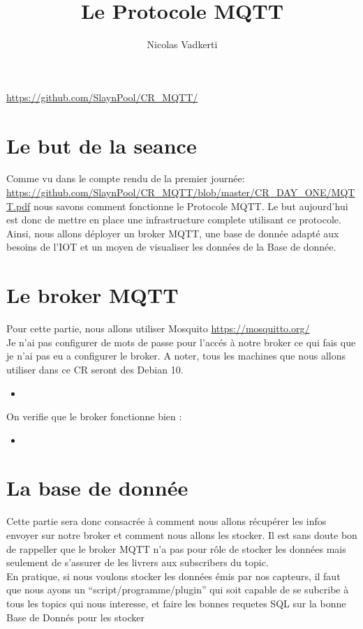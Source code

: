 \documentclass[10pt,a4paper]{article}
\title{Le Protocole MQTT}
\author{Nicolas Vadkerti}
\newcommand{\insertcode}[2]{\begin{itemize}\item[]\end{itemize}}
\begin{document}
\maketitle


\url{https://github.com/SlaynPool/CR_MQTT/}


\section{Le but de la seance}
Comme vu dans le compte rendu de la premier journée:
\url{https://github.com/SlaynPool/CR_MQTT/blob/master/CR_DAY_ONE/MQTT.pdf}
nous savons comment fonctionne le Protocole MQTT. Le but aujourd'hui est donc de mettre en place une infrastructure complete utilisant ce protocole.\\
Ainsi, nous allons déployer un broker MQTT, une base de donnée adapté aux besoins de l'IOT et un moyen de visualiser les données de la Base de donnée.
\section{Le broker MQTT}
Pour cette partie, nous allons utiliser Mosquito \url{https://mosquitto.org/}\\
Je n'ai pas configurer de mots de passe pour l'accés à notre broker ce qui fais que je n'ai pas eu a configurer le broker.
A noter,  tous les machines que nous allons utiliser dans ce CR seront des Debian 10.
\insertcode{commande/installBroker.txt}{Installation du broker}
On verifie que le broker fonctionne bien :

 \insertcode{commande/testbroker.txt}{Test du broker}
 
 
 \section{La base de donnée}
 
 Cette partie sera donc consacrée à comment nous allons récupérer les infos envoyer sur notre broker et comment nous allons les stocker. Il est sans doute bon de rappeller que le broker MQTT n'a pas pour rôle de stocker les données mais seulement de s'assurer de les livrers aux subscribers du topic. \\
 En pratique, si nous voulons stocker les données émis par nos capteurs, il faut que nous ayons un ``script/programme/plugin'' qui soit capable de se subcribe à tous les topics qui nous interesse, et faire les bonnes requetes SQL sur la bonne Base de Donnés pour les stocker 
\end{document}
